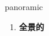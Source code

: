
\begin{frame}
{\huge panoramic}
\begin{center}
\begin{enumerate}\Large
  \item \textbf{全景的}
\end{enumerate}
\end{center}
\end{frame}

